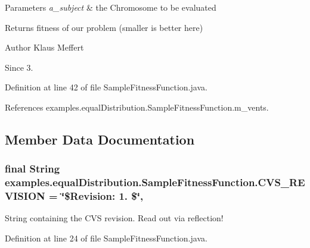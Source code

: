 \begin{DoxyParams}{Parameters}
{\em a\-\_\-subject} & the Chromosome to be evaluated \\
\hline
\end{DoxyParams}
\begin{DoxyReturn}{Returns}
fitness of our problem (smaller is better here)
\end{DoxyReturn}
\begin{DoxyAuthor}{Author}
Klaus Meffert 
\end{DoxyAuthor}
\begin{DoxySince}{Since}
3. 
\end{DoxySince}


Definition at line 42 of file Sample\-Fitness\-Function.\-java.



References examples.\-equal\-Distribution.\-Sample\-Fitness\-Function.\-m\-\_\-vents.



\subsection{Member Data Documentation}
\hypertarget{classexamples_1_1equal_distribution_1_1_sample_fitness_function_a151822990a94c71c79c3d372592e4afa}{
\subsubsection[{C\-V\-S\-\_\-\-R\-E\-V\-I\-S\-I\-O\-N}]{\setlength{\rightskip}{0pt plus 5cm}final String examples.\-equal\-Distribution.\-Sample\-Fitness\-Function.\-C\-V\-S\-\_\-\-R\-E\-V\-I\-S\-I\-O\-N = \char`\"{}\$Revision\-: 1. \$\char`\"{}\hspace{0.3cm}{\ttfamily [static]}, {\ttfamily [private]}}}\label{classexamples_1_1equal_distribution_1_1_sample_fitness_function_a151822990a94c71c79c3d372592e4afa}
String containing the C\-V\-S revision. Read out via reflection! 

Definition at line 24 of file Sample\-Fitness\-Function.\-java.

